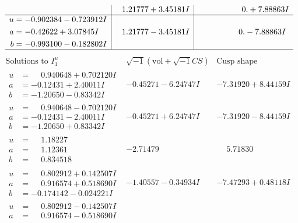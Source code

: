 \documentclass[1p]{elsarticle_modified}
\theoremstyle{definition}
\newcommand{\I}{\sqrt{-1}}
\begin{document}
$$\begin{array}{c|c|c}
 & \phantom{-}1.21777 + 3.45181 I & \phantom{-0.000000 -}0. + 7.88863 I \\ \hline\begin{aligned}
u &= -0.902384 - 0.723912 I \\
a &= -0.42622 + 3.07845 I \\
b &= -0.993100 - 0.182802 I\end{aligned}
 & \phantom{-}1.21777 - 3.45181 I & \phantom{-0.000000 } 0. - 7.88863 I\\
 \hline 
 \end{array}$$\newpage$$\begin{array}{c|c|c}  
\text{Solutions to }I^u_{1}& \I (\text{vol} + \sqrt{-1}CS) & \text{Cusp shape}\\
 \hline 
\begin{aligned}
u &= \phantom{-}0.940648 + 0.702120 I \\
a &= -0.12431 + 2.40011 I \\
b &= -1.20650 - 0.83342 I\end{aligned}
 & -0.45271 - 6.24747 I & -7.31920 + 8.44159 I \\ \hline\begin{aligned}
u &= \phantom{-}0.940648 - 0.702120 I \\
a &= -0.12431 - 2.40011 I \\
b &= -1.20650 + 0.83342 I\end{aligned}
 & -0.45271 + 6.24747 I & -7.31920 - 8.44159 I \\ \hline\begin{aligned}
u &= \phantom{-}1.18227\phantom{ +0.000000I} \\
a &= \phantom{-}1.12361\phantom{ +0.000000I} \\
b &= \phantom{-}0.834518\phantom{ +0.000000I}\end{aligned}
 & -2.71479\phantom{ +0.000000I} & \phantom{-}5.71830\phantom{ +0.000000I} \\ \hline\begin{aligned}
u &= \phantom{-}0.802912 + 0.142507 I \\
a &= \phantom{-}0.916574 + 0.518690 I \\
b &= -0.174142 - 0.024221 I\end{aligned}
 & -1.40557 - 0.34934 I & -7.47293 + 0.48118 I \\ \hline\begin{aligned}
u &= \phantom{-}0.802912 - 0.142507 I \\
a &= \phantom{-}0.916574 - 0.518690 I \\

\end{aligned}
\end{array}$$
\end{document}
